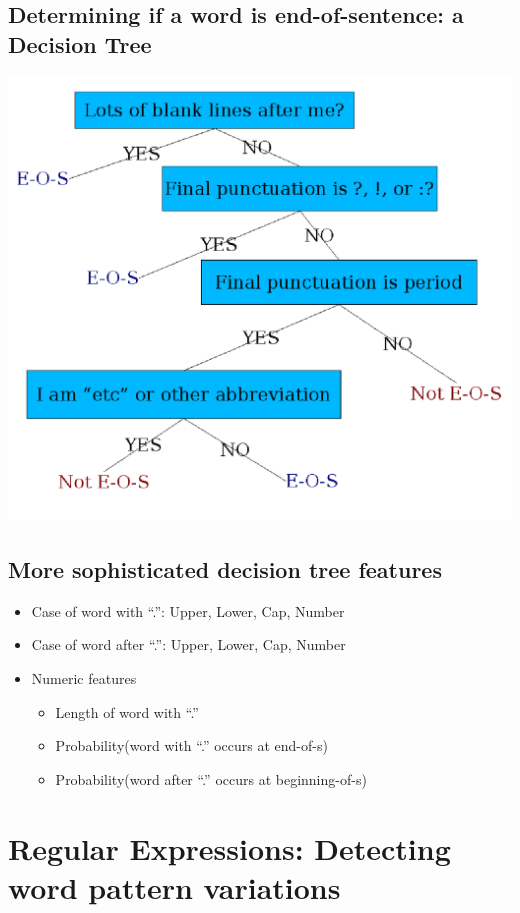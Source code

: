 \documentclass[11pt]{article}
\theoremstyle{definition}
\begin{document}
\subsection{Determining if a word is end-of-sentence:
a Decision Tree}
\includegraphics[width=\textwidth/2]{6.png}
\subsection{More sophisticated decision tree features}
\begin{itemize}
  \item Case of word with “.”: Upper, Lower, Cap, Number
  \item Case of word after “.”: Upper, Lower, Cap, Number
  \item Numeric features
  \begin{itemize}
    \item Length of word with “.”
    \item Probability(word with “.” occurs at end-of-s)
    \item Probability(word after “.” occurs at beginning-of-s)
  \end{itemize}
\end{itemize}

\section{Regular
Expressions:
Detecting word
pattern variations}
\end{document}
